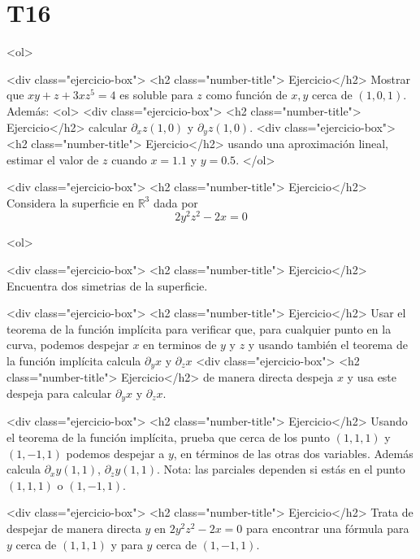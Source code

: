 \documentclass{article}
\theoremstyle{definition}
\begin{document}
  \section*{T16 }

  
  
	<ol>

        <div class="ejercicio-box"> <h2 class="number-title"> Ejercicio</h2> Mostrar que $xy+z+3xz^5=4$ es soluble para $z$ como
          función de $x,y$ cerca de $(1,0,1)$. Además:
          <ol>
          <div class="ejercicio-box"> <h2 class="number-title"> Ejercicio</h2> calcular $\partial_xz(1,0)$ y $\partial_yz(1,0)$.
          <div class="ejercicio-box"> <h2 class="number-title"> Ejercicio</h2> usando una aproximación lineal, estimar el valor de $z$
            cuando $x=1.1$ y $y=0.5$.
          </ol>
          
        <div class="ejercicio-box"> <h2 class="number-title"> Ejercicio</h2> Considera la superficie en $\mathbb{R}^3$ dada por
          $$
          2y^2z^2-2x=0
          $$

          <ol>

          <div class="ejercicio-box"> <h2 class="number-title"> Ejercicio</h2> Encuentra dos simetrias de la superficie.
            
          <div class="ejercicio-box"> <h2 class="number-title"> Ejercicio</h2> Usar el teorema de la función implícita para verificar
            que, para cualquier punto en la curva,
            podemos despejar $x$ en terminos de $y$ y $z$ y usando
            también el teorema de la función implícita
            calcula $\partial_y x$ y $\partial_z x$
          <div class="ejercicio-box"> <h2 class="number-title"> Ejercicio</h2> de manera directa despeja $x$ y usa este despeja para calcular
            $\partial_y x$ y $\partial_z x$.

            

          <div class="ejercicio-box"> <h2 class="number-title"> Ejercicio</h2> Usando el teorema de la función
            implícita, prueba que cerca de los punto $(1,1,1)$ y $(1,-1,1)$ podemos
            despejar a  $y$, en términos de las otras dos variables. Además
            calcula $\partial_xy(1,1)$, $\partial_z y (1,1)$. Nota:
            las parciales dependen si estás en el punto $(1,1,1)$ o $(1,-1,1)$.

          <div class="ejercicio-box"> <h2 class="number-title"> Ejercicio</h2> Trata de despejar de manera directa $y$ en $2y^2z^2-2x=0$
            para encontrar una fórmula para $y$ cerca de $(1,1,1)$
            y para $y$ cerca de $(1,-1,1)$.
            
\end{document}
